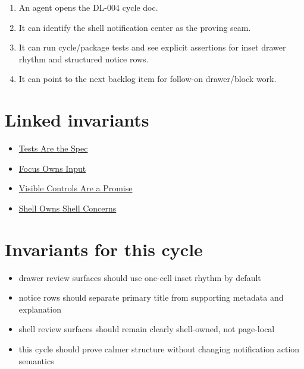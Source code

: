 \begin{enumerate}
\def\labelenumi{\arabic{enumi}.}
\tightlist
\item
  An agent opens the DL-004 cycle doc.
\item
  It can identify the shell notification center as the proving seam.
\item
  It can run cycle/package tests and see explicit assertions for inset drawer rhythm and structured notice rows.
\item
  It can point to the next backlog item for follow-on drawer/block work.
\end{enumerate}

\section{Linked invariants}\label{record-171-linked-invariants}

\begin{itemize}
\tightlist
\item
  \href{https://github.com/flyingrobots/bijou/blob/cbd70612140e7a450d764b3c7be1c6af878b99bc/docs/invariants/tests-are-the-spec.md}{Tests Are the Spec}
\item
  \href{https://github.com/flyingrobots/bijou/blob/cbd70612140e7a450d764b3c7be1c6af878b99bc/docs/invariants/focus-owns-input.md}{Focus Owns Input}
\item
  \href{https://github.com/flyingrobots/bijou/blob/cbd70612140e7a450d764b3c7be1c6af878b99bc/docs/invariants/visible-controls-are-a-promise.md}{Visible Controls Are a Promise}
\item
  \href{https://github.com/flyingrobots/bijou/blob/cbd70612140e7a450d764b3c7be1c6af878b99bc/docs/invariants/shell-owns-shell-concerns.md}{Shell Owns Shell Concerns}
\end{itemize}

\section{Invariants for this cycle}\label{record-171-invariants-for-this-cycle}

\begin{itemize}
\tightlist
\item
  drawer review surfaces should use one-cell inset rhythm by default
\item
  notice rows should separate primary title from supporting metadata and explanation
\item
  shell review surfaces should remain clearly shell-owned, not page-local
\item
  this cycle should prove calmer structure without changing notification action semantics
\end{itemize}

